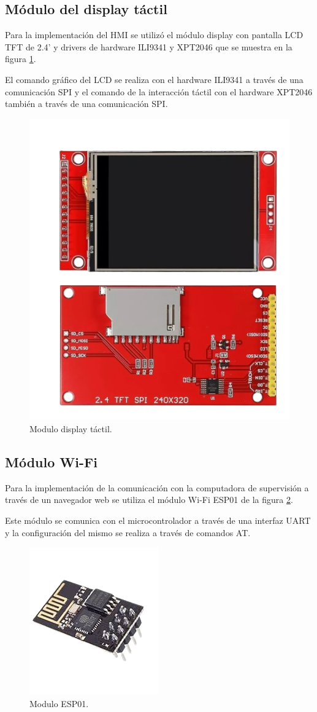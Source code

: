 \subsection{Módulo del display táctil}
Para la implementación del HMI se utilizó el módulo display \cite{LCD} con pantalla LCD TFT de 2.4' y drivers de hardware ILI9341 y XPT2046 que se muestra en la figura \ref{fig:hmi}.

El comando gráfico del LCD se realiza con el hardware ILI9341 a través de una comunicación SPI y el comando de la interacción táctil con el hardware XPT2046 también a través de una comunicación SPI.

\begin{figure}[H]
  \centering
  \includegraphics[width=0.5\linewidth]{introduccion-especifica/img/hmi.png}
  \caption{Modulo display táctil.}
  \label{fig:hmi}
\end{figure}

\subsection{Módulo Wi-Fi}
Para la implementación de la comunicación con la computadora de supervisión a través de un navegador web se utiliza el módulo Wi-Fi ESP01 \cite{ESP01} de la figura \ref{fig:esp01}.

Este módulo se comunica con el microcontrolador a través de una interfaz UART y la configuración del mismo se realiza a través de comandos AT.

\begin{figure}[H]
  \centering
  \includegraphics[width=0.35\linewidth]{introduccion-especifica/img/ESP01.png}
  \caption{Modulo ESP01.}
  \label{fig:esp01}
\end{figure}

